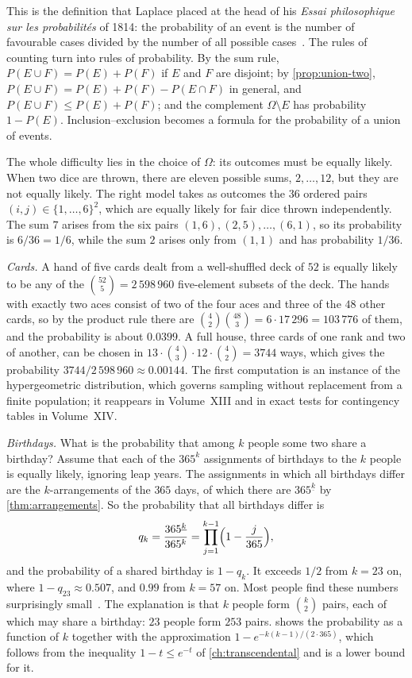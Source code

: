 This is the definition that Laplace placed at the head of his \emph{Essai philosophique sur les probabilit\'es} of 1814: the probability of an event is the number of favourable cases divided by the number of all possible cases~\cite{laplace1814}. The rules of counting turn into rules of probability. By the sum rule, $P(E\cup F)=P(E)+P(F)$ if $E$ and $F$ are disjoint; by \cref{prop:union-two}, $P(E\cup F)=P(E)+P(F)-P(E\cap F)$ in general, and $P(E\cup F)\le P(E)+P(F)$; and the complement $\Omega\setminus E$ has probability $1-P(E)$. Inclusion--exclusion becomes a formula for the probability of a union of events.

The whole difficulty lies in the choice of $\Omega$: its outcomes must be equally likely. When two dice are thrown, there are eleven possible sums, $2,\ldots,12$, but they are not equally likely. The right model takes as outcomes the $36$ ordered pairs $(i,j)\in\{1,\ldots,6\}^2$, which are equally likely for fair dice thrown independently. The sum $7$ arises from the six pairs $(1,6),(2,5),\ldots,(6,1)$, so its probability is $6/36=1/6$, while the sum $2$ arises only from $(1,1)$ and has probability $1/36$.

\emph{Cards.} A hand of five cards dealt from a well-shuffled deck of $52$ is equally likely to be any of the $\binom{52}5=2\,598\,960$ five-element subsets of the deck. The hands with exactly two aces consist of two of the four aces and three of the $48$ other cards, so by the product rule there are $\binom42\binom{48}3=6\cdot17\,296=103\,776$ of them, and the probability is about $0.0399$. A full house, three cards of one rank and two of another, can be chosen in $13\cdot\binom43\cdot12\cdot\binom42=3744$ ways, which gives the probability $3744/2\,598\,960\approx0.00144$. The first computation is an instance of the hypergeometric distribution, which governs sampling without replacement from a finite population; it reappears in Volume~XIII and in exact tests for contingency tables in Volume~XIV.

\emph{Birthdays.} What is the probability that among $k$ people some two share a birthday? Assume that each of the $365^k$ assignments of birthdays to the $k$ people is equally likely, ignoring leap years. The assignments in which all birthdays differ are the $k$-arrangements of the $365$ days, of which there are $365^{\underline k}$ by \cref{thm:arrangements}. So the probability that all birthdays differ is
\[
q_k=\frac{365^{\underline k}}{365^k}=\prod_{j=1}^{k-1}\Bigl(1-\frac{j}{365}\Bigr),
\]
and the probability of a shared birthday is $1-q_k$. It exceeds $1/2$ from $k=23$ on, where $1-q_{23}\approx0.507$, and $0.99$ from $k=57$ on. Most people find these numbers surprisingly small~\cite{feller1968}. The explanation is that $k$ people form $\binom k2$ pairs, each of which may share a birthday: $23$ people form $253$ pairs.  shows the probability as a function of $k$ together with the approximation $1-e^{-k(k-1)/(2\cdot365)}$, which follows from the inequality $1-t\le e^{-t}$ of \cref{ch:transcendental} and is a lower bound for it.


